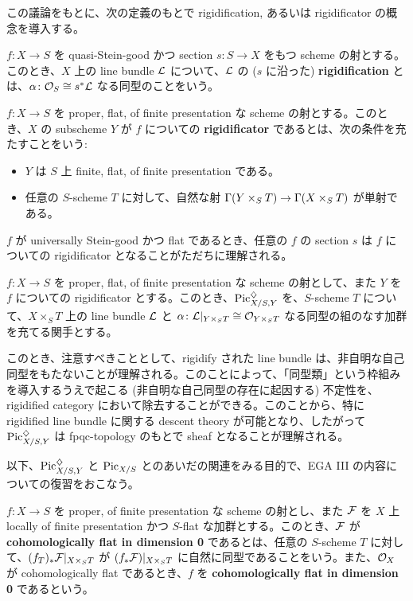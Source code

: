 この議論をもとに、次の定義のもとで rigidification, あるいは rigidificator の概念を導入する。

\begin{defn}[rigidification]
  $f \colon X \to S$ を quasi-Stein-good かつ section $s \colon S \to X$ をもつ scheme の射とする。このとき、$X$ 上の line bundle $\mathcal{L}$ について、$\mathcal{L}$ の ($s$ に沿った) \textbf{rigidification} とは、$\alpha \colon \mathcal{O}_S \cong s^*\mathcal{L}$ なる同型のことをいう。
\end{defn}

\begin{defn}[rigidificator]
  $f \colon X \to S$ を proper, flat, of finite presentation な scheme の射とする。このとき、$X$ の subscheme $Y$ が $f$ についての \textbf{rigidificator} であるとは、次の条件を充たすことをいう:
  \begin{itemize}
    \item $Y$ は $S$ 上 finite, flat, of finite presentation である。
    \item 任意の $S$-scheme $T$ に対して、自然な射 $\Gamma(Y \times_S T) \to \Gamma(X \times_S T)$ が単射である。
  \end{itemize}
\end{defn}

\begin{note}
  $f$ が universally Stein-good かつ flat であるとき、任意の $f$ の section $s$ は $f$ についての rigidificator となることがただちに理解される。
\end{note}

$f \colon X \to S$ を proper, flat, of finite presentation な scheme の射として、また $Y$ を $f$ についての rigidificator とする。このとき、$\mathrm{Pic}^\diamondsuit_{X / S, Y}$ を、$S$-scheme $T$ について、$X \times_S T$ 上の line bundle $\mathcal{L}$ と $\alpha \colon \mathcal{L}|_{Y \times_S T} \cong \mathcal{O}_{Y \times_S T}$ なる同型の組のなす加群を充てる関手とする。

このとき、注意すべきこととして、rigidify された line bundle は、非自明な自己同型をもたないことが理解される。このことによって、「同型類」という枠組みを導入するうえで起こる (非自明な自己同型の存在に起因する) 不定性を、rigidified category において除去することができる。このことから、特に rigidified line bundle に関する descent theory が可能となり、したがって $\mathrm{Pic}^\diamondsuit_{X / S, Y}$ は fpqc-topology のもとで sheaf となることが理解される。

以下、$\mathrm{Pic}^\diamondsuit_{X / S, Y}$ と $\mathrm{Pic}_{X / S}$ とのあいだの関連をみる目的で、EGA III の内容についての復習をおこなう。

\begin{defn}
  $f \colon X \to S$ を proper, of finite presentation な scheme の射とし、また $\mathcal{F}$ を $X$ 上 locally of finite presentation かつ $S$-flat な加群とする。このとき、$\mathcal{F}$ が \textbf{cohomologically flat in dimension 0} であるとは、任意の $S$-scheme $T$ に対して、$(f_T)_*\mathcal{F}|_{X \times_S T}$ が $(f_*\mathcal{F})|_{X \times_S T}$ に自然に同型であることをいう。また、$\mathcal{O}_X$ が cohomologically flat であるとき、$f$ を \textbf{cohomologically flat in dimension 0} であるという。
\end{defn}

